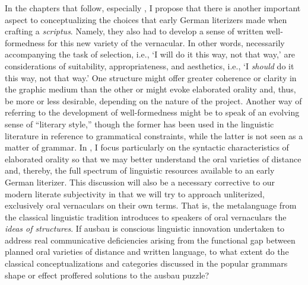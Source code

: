 In the chapters that follow, especially , I propose that there is another important aspect to conceptualizing the choices that early German literizers made when crafting a \textit{scriptus}. Namely, they also had to develop a sense of written well-formedness for this new variety of the vernacular. In other words, necessarily accompanying the task of selection, i.e., ‘I will do it this way, not that way,’ are considerations of suitability, appropriateness, and aesthetics, i.e., ‘I \textit{should} do it this way, not that way.’ One structure might offer greater coherence or clarity in the graphic medium than the other or might evoke elaborated orality and, thus, be more or less desirable, depending on the nature of the project. Another way of referring to the development of well-formedness might be to speak of an evolving sense of “literary style,” though the former has been used in the linguistic literature in reference to grammatical constraints, while the latter is not seen as a matter of grammar. In , I focus particularly on the syntactic characteristics of elaborated orality so that we may better understand the oral varieties of distance and, thereby, the full spectrum of linguistic resources available to an early German literizer. This discussion will also be a necessary corrective to our modern literate subjectivity in that we will try to approach unliterized, exclusively oral vernaculars on their own terms. That is, the metalanguage from the classical linguistic tradition introduces to speakers of oral vernaculars the \textit{ideas of structures}. If ausbau is conscious linguistic innovation undertaken to address real communicative deficiencies arising from the functional gap between planned oral varieties of distance and written language, to what extent do the classical conceptualizations and categories discussed in the popular grammars shape or effect proffered solutions to the ausbau puzzle?

